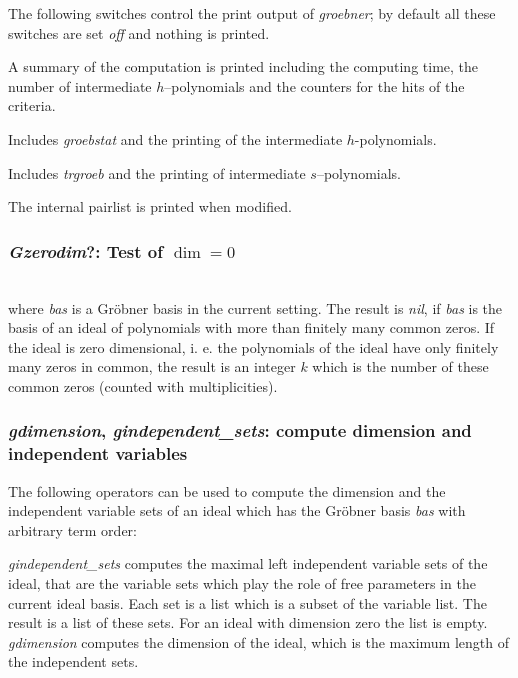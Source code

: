 The following switches control the print output of \emph{groebner}; by
default all these switches are set \emph{off} and nothing is printed.
\begin{description}
\item[\emph{groebstat} --] A summary of the computation is printed
including the computing time, the number of intermediate
$h$--polynomials and the counters for the hits of the criteria.

\item[\emph{trgroeb} --] Includes \emph{groebstat} and the printing of the
intermediate $h$-polynomials.

\item[\emph{trgroebs} --] Includes \emph{trgroeb} and the printing of
intermediate $s$--poly\-nomials.

\item[\emph{trgroeb1} --] The internal pairlist is printed when modified.
\end{description}

\subsubsection{\emph{Gzerodim}?: Test of $\dim = 0$}
\begin{description}
\item[{\it gzerodim}!? \emph{bas}]\mbox{}\\
where {\it bas} is a Gr\"obner basis in the current setting.
The result is {\it nil}, if {\it bas} is the
basis of an ideal of polynomials with more than finitely many common zeros.
If the ideal is zero dimensional, i. e. the polynomials of the ideal have only
finitely many zeros in common, the result is an integer $k$ which is the number
of these common zeros (counted with multiplicities).
\end{description}

\subsubsection{\emph{gdimension}, \emph{gindependent\_sets}: compute dimension and
independent variables}
The following operators can be used to compute the dimension
and the independent variable sets of an ideal which has the
Gr\"obner basis {\it bas} with arbitrary term order:
\begin{description}
\item[\emph{gdimension bas}]
\item[\emph{gindependent\_sets bas}]
{\it gindependent\_sets} computes the maximal
left independent variable sets of the ideal, that are
the variable sets which play the role of free parameters in the
current ideal basis. Each set is a list which is a subset of the
variable list. The result is a list of these sets. For an
ideal with dimension zero the list is empty.
{\it gdimension} computes the dimension of the ideal,
which is the maximum length of the independent sets.
\end{description}

